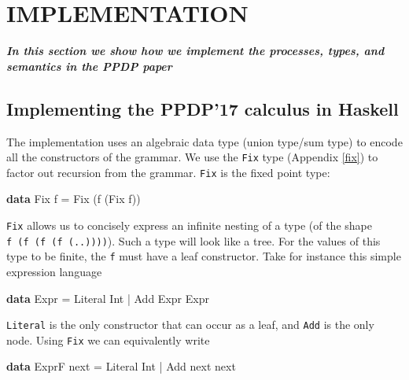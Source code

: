 \documentclass[runningheads,plain]{llncs}
\newenvironment{Shaded}{}{}
\newcommand{\KeywordTok}[1]{\textcolor[rgb]{0.00,0.44,0.13}{\textbf{#1}}}
\newcommand{\DataTypeTok}[1]{\textcolor[rgb]{0.56,0.13,0.00}{#1}}
\newcommand{\FunctionTok}[1]{\textcolor[rgb]{0.02,0.16,0.49}{#1}}
\newcommand{\NormalTok}[1]{#1}
\begin{document}
\section{IMPLEMENTATION}
\textbf{\emph{In this section we show how we implement the processes, types, and semantics in the PPDP paper}}

\subsection{Implementing the PPDP'17 calculus in
Haskell}\label{implementing-the-ppdp17-calculus-in-haskell}

The implementation uses an algebraic data type (union type/sum type) to
encode all the constructors of the grammar. We use the \texttt{Fix} type
(Appendix \ref{fix}) to factor out recursion from the grammar.
\texttt{Fix} is the fixed point type:

\begin{Shaded}
\begin{Highlighting}[]
\KeywordTok{data} \DataTypeTok{Fix}\NormalTok{ f }\FunctionTok{=} \DataTypeTok{Fix}\NormalTok{ (f (}\DataTypeTok{Fix}\NormalTok{ f))}
\end{Highlighting}
\end{Shaded}

\texttt{Fix} allows us to concisely express an infinite nesting of a
type (of the shape \texttt{f\ (f\ (f\ (f\ (..))))}). Such a type will
look like a tree. For the values of this type to be finite, the
\texttt{f} must have a leaf constructor. Take for instance this simple
expression language

\begin{Shaded}
\begin{Highlighting}[]
\KeywordTok{data} \DataTypeTok{Expr}
    \FunctionTok{=} \DataTypeTok{Literal} \DataTypeTok{Int}
    \FunctionTok{|} \DataTypeTok{Add} \DataTypeTok{Expr} \DataTypeTok{Expr} 
\end{Highlighting}
\end{Shaded}

\texttt{Literal} is the only constructor that can occur as a leaf, and
\texttt{Add} is the only node. Using \texttt{Fix} we can equivalently
write

\begin{Shaded}
\begin{Highlighting}[]
\KeywordTok{data} \DataTypeTok{ExprF}\NormalTok{ next}
    \FunctionTok{=} \DataTypeTok{Literal} \DataTypeTok{Int}
    \FunctionTok{|} \DataTypeTok{Add}\NormalTok{ next next }
\end{Highlighting}
\end{Shaded}
\end{document}
